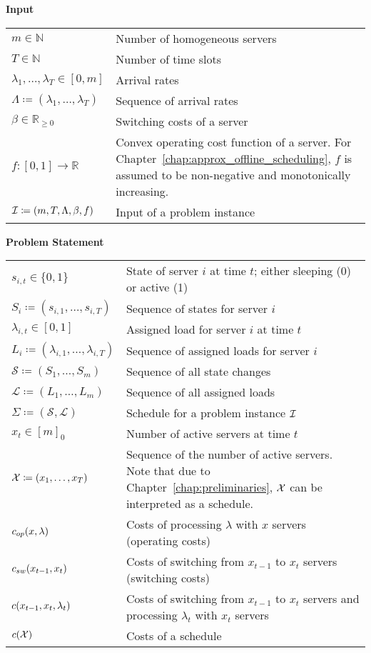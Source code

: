 
\large{\textbf{Input}}
\bgroup
\def\arraystretch{1.5}%
\begin{longtable}{p{} p{}}
  $m\in\mathbb{N}$ & Number of homogeneous servers \\
  $T\in\mathbb{N}$& Number of time slots\\
  $\lambda_1,\dotsc,\lambda_{T}\in[0,m]$& Arrival rates\\
  $\Lambda\coloneqq(\lambda_1,\dotsc,\lambda_T)$& Sequence of arrival rates\\
  $\beta\in\mathbb{R}_{\ge 0}$& Switching costs of a server\\
  $f:[0,1]\rightarrow\mathbb{R}$& Convex operating cost function of a server. For Chapter~\ref{chap:approx_offline_scheduling}, $f$ is assumed to be non-negative and monotonically increasing.\\
  $\mathcal{I}\coloneqq(m,T,\Lambda,\beta,f)$& Input of a problem instance
\end{longtable}
\large{\textbf{Problem Statement}}
\begin{longtable}{p{} p{}}
  $s_{i,t}\in\{0,1\}$& State of server $i$ at time $t$; either sleeping (0) or active (1)\\
  $S_i\coloneqq(s_{i,1},\dotsc,s_{i,T})$& Sequence of states for server $i$\\
  $\lambda_{i,t}\in[0,1]$& Assigned load for server $i$ at time $t$\\
  $L_i\coloneqq(\lambda_{i,1},\dotsc,\lambda_{i,T})$& Sequence of assigned loads for server $i$\\
  $\mathcal{S}\coloneqq(S_1,\dotsc,S_m)$& Sequence of all state changes\\
  $\mathcal{L}\coloneqq(L_1,\dotsc,L_m)$& Sequence of all assigned loads\\
  $\Sigma\coloneqq(\mathcal{S},\mathcal{L})$& Schedule for a problem instance $\mathcal{I}$\\
  $x_t\in[m]_0$& Number of active servers at time $t$\\
  $\mathcal{X}\coloneqq(x_1,\ldots,x_T)$& Sequence of the number of active servers. Note that due to Chapter~\ref{chap:preliminaries}, $\mathcal{X}$ can be interpreted as a schedule.\\
  $c_{op}(x,\lambda)$& Costs of processing $\lambda$ with $x$ servers (operating costs)\\
  $c_{sw}(x_{t-1},x_{t})$& Costs of switching from $x_{t-1}$ to $x_t$ servers (switching costs)\\
  $c(x_{t-1},x_{t},\lambda_t)$& Costs of switching from $x_{t-1}$ to $x_t$ servers and processing $\lambda_t$ with $x_t$ servers\\
  $c(\mathcal{X})$& Costs of a schedule
\end{longtable}
